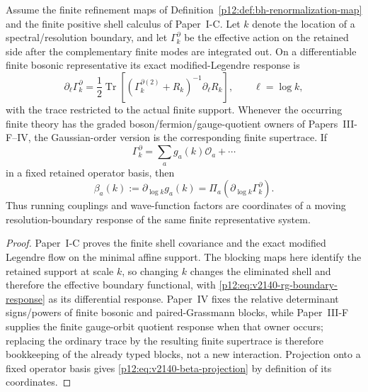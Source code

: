 \documentclass[12pt,a4paper]{article}
\begin{document}
\begin{theorem}
\label{p12:thm:v2140-rg-boundary-response}
Assume the finite refinement maps of
Definition~\ref{p12:def:bh-renormalization-map} and the finite positive shell
calculus of Paper~I-C.  Let $k$ denote the location of a spectral/resolution
boundary, and let $\Gamma_k^{\partial}$ be the effective action on the
retained side after the complementary finite modes are integrated out.  On a
differentiable finite bosonic representative its exact modified-Legendre
response is
\begin{equation}
\label{p12:eq:v2140-rg-boundary-response}
 \boxed{
 \partial_{\ell}\Gamma_k^{\partial}
 =\frac12\operatorname{Tr}
 \left[(\Gamma_k^{\partial(2)}+R_k)^{-1}\partial_{\ell}R_k\right],}
 \qquad \ell=\log k,
\end{equation}
with the trace restricted to the actual finite support.  Whenever the
occurring finite theory has the graded boson/fermion/gauge-quotient owners of
Papers~III-F--IV, the Gaussian-order version is the corresponding finite
supertrace.  If
\[
 \Gamma_k^{\partial}=\sum_a g_a(k)\mathcal O_a+\cdots
\]
in a fixed retained operator basis, then
\begin{equation}
\label{p12:eq:v2140-beta-projection}
 \boxed{
 \beta_a(k):=\partial_{\log k}g_a(k)
 =\Pi_a\!\left(\partial_{\log k}\Gamma_k^{\partial}\right).}
\end{equation}
Thus running couplings and wave-function factors are coordinates of a moving
resolution-boundary response of the same finite representative system.
\end{theorem}

\begin{proof}
Paper~I-C proves the finite shell covariance and the exact modified Legendre
flow on the minimal affine support.  The blocking maps here identify the
retained support at scale $k$, so changing $k$ changes the eliminated shell
and therefore the effective boundary functional, with
\eqref{p12:eq:v2140-rg-boundary-response} as its differential response.
Paper~IV fixes the relative determinant signs/powers of finite bosonic and
paired-Grassmann blocks, while Paper~III-F supplies the finite gauge-orbit
quotient response when that owner occurs; replacing the ordinary trace by the
resulting finite supertrace is therefore bookkeeping of the already typed
blocks, not a new interaction.  Projection onto a fixed operator basis gives
\eqref{p12:eq:v2140-beta-projection} by definition of its coordinates.
\end{proof}
\end{document}
